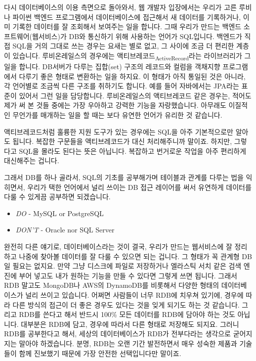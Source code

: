\documentclass[11pt,a4paper]{article}
\newcommand{\sub}[1]{\textsubscript{#1}}
\begin{document}
다시 데이터베이스의 이용 측면으로 돌아와서, 웹 개발자 입장에서는 우리가 고른 루비나 파이썬 백엔드 프로그램에서 데이터베이스에 접근해서 새 데이터를 기록하거나, 이미 기록한 데이터를 잘 조회해서 보여주는 일을 합니다. 그때 우리가 만드는 백엔드 소프트웨어(웹서비스)가 DB와 통신하기 위해 사용하는 언어가 SQL입니다. 백엔드가 직접 SQL을 거의 그대로 쓰는 경우는 요새는 별로 없고, 그 사이에 조금 더 편리한 계층이 있습니다. 루비온레일스의 경우에는 액티브레코드\sub{ActiveRecord}라는 라이브러리가 그 일을 합니다. DB서버가 다루는 집합(set) 구조의 레코드와 컬럼을 객채지향 프로그램에서 다루기 좋은 형태로 변환하는 일을 하지요. 이 형태가 아직 통일된 것은 아니라, 각 언어별로 조금씩 다른 구조를 취하기도 합니다. 예를 들어 자바에서는 JPA라는 표준이 있어서 그런 일을 담당합니다. 루비온레일스의 액티브레코드 같은 경우는, 적어도 제가 써 본 것들 중에는 가장 우아하고 강력한 기능을 자랑했습니다. 아무래도 이질적인 무언가를 매개하는 일을 할 때는 보다 유연한 언어가 유리한 것 같습니다.

액티브레코드처럼 훌륭한 지원 도구가 있는 경우에는 SQL을 아주 기본적으로만 알아도 됩니다. 복잡한 구문들을 액티브레코드가 대신 처리해주니까 말이죠. 하지만, 그렇다고 SQL을 몰라도 된다는 뜻은 아닙니다. 복잡하고 번거로운 작업을 아주 편리하게 대신해주는 겁니다.

그래서 DB를 하나 골라서, SQL의 기초를 공부해가며 테이블과 관계를 다루는 법을 익히면서, 우리가 택한 언어에서 널리 쓰이는 DB 접근 레이어를 써서 유연하게 데이터를 다룰 수 있게끔 공부하면 되겠습니다.

\begin{itemize}
\item \emph{DO} - MySQL or PostgreSQL
\item \emph{DON'T} - Oracle nor SQL Server
\end{itemize}

완전히 다른 얘기로, 데이터베이스라는 것이 결국, 우리가 만드는 웹서비스에 잘 정리하고 나중에 찾아볼 데이터를 잘 다룰 수 있으면 되는 겁니다. 그 형태가 꼭 관계형 DB일 필요는 없지요. 만약 그냥 디스크에 파일로 저장하거나 엘라스틱 서치 같은 검색 엔진에 부어 넣고도 내가 원하는 기능을 만들 수 있다면 그렇게 쓰면 됩니다. 그래서 RDB 말고도 MongoDB나 AWS의 DynamoDB를 비롯해서 다양한 형태의 데이터베이스가 널리 쓰이고 있습니다. 어쩌면 사람들이 너무 RDB에 치우쳐 있기에, 경우에 따라 다른 방식의 접근이 더 좋은 경우도 있다는 것을 잊게 되기도 하는 것 같습니다. 그리고 RDB를 쓴다고 해서 반드시 100\% 모든 데이터를 RDB에 담아야 하는 것도 아닙니다. 대부분은 RDB에 담고, 경우에 따라서 다른 형태로 저장해도 되지요. 그러니 RDB를 공부한다고 해서, 세상의 데이터베이스가 RDB가 전부다라는 생각으로 굳어지지는 말아야 하겠습니다. 분명, RDB는 오랜 기간 발전하면서 매우 성숙한 제품과 기술들이 함께 진보했기 때문에 가장 안전한 선택입니다만 말이죠.
\end{document}
